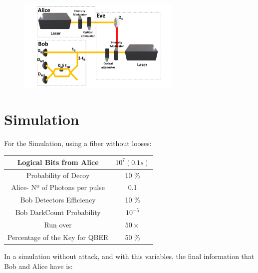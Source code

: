 \documentclass[1000pt]{article}
\newcommand{\mysection}[1]{\section*{\color{black}\sffamily #1}}%
\begin{document}
\begin{figure}[hbt]
    	\centering
    	\includegraphics[width=0.7\textwidth]{./figures/E.pdf}
\end{figure}
\mysection{\Huge\textbf{Simulation}} \Large \vspace*{1cm}

For the Simulation, using a fiber without looses:
\begin{table}[hbt!]
\centering
\large
\begin{tabular}{|c|c|}
\hline
\cellcolor[HTML]{005288}\color{white} Logical Bits from Alice & $10^{7} (0.1 s)$ \\ \hline
\cellcolor[HTML]{005288}\color{white} Probability of Decoy & 10 \% \\ \hline
\cellcolor[HTML]{005288}\color{white} Alice- Nº of Photons per pulse & 0.1\\ \hline
\cellcolor[HTML]{005288}\color{white} Bob Detectors Efficiency  & 10 \% \\ \hline
\cellcolor[HTML]{005288}\color{white} Bob DarkCount Probability & $10^{-5}$ \\ \hline
\cellcolor[HTML]{005288}\color{white} Run over & $50 \times$\\ \hline
\cellcolor[HTML]{005288}\color{white} Percentage of the Key for QBER & 50 \% \\ \hline

\end{tabular}
\end{table}

In a simulation without attack, and with this variables, the final information that Bob and Alice have is:
\end{document}
